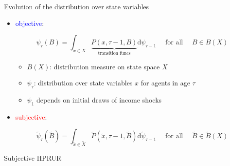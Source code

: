 \documentclass{beamer}
\begin{document}
\begin{frame}{Evolution of the distribution over state variables}
	\begin{itemize}
		\item \textcolor{blue}{objective}: 
		
		\begin{equation*}
			\label{Eq:DistDynObj}
			\psi_{\tau}(B)=\int_{x \in X} \underbrace{P(x, \tau-1, B)}_{\text{transition funcs}}  \mathrm{d}\psi_{\tau-1} \quad \text { for all } \quad B\in B(X)
		\end{equation*}
		
		\begin{itemize}
			\item $B(X)$:  distribution measure on state space $X$
			\item $\psi_{\tau}$: distribution over state variables $x$ for agents in age $\tau$
			\item $\psi_{1}$ depends on initial draws of income shocks 
		\end{itemize}
		
		\item \textcolor{red}{subjective}: 
		
		\begin{equation*}
			\label{Eq:DistDynSub}
			\tilde \psi_{\tau}(\tilde B)=\int_{\tilde x \in \tilde X} \tilde P(\tilde x, \tau-1, \tilde B) \mathrm{d} \tilde \psi_{\tau-1} \quad \text { for all } \quad \tilde B \in \tilde B(X)
		\end{equation*}
		
	\end{itemize}
\end{frame}


\begin{frame}{Subjective HPRUR}
	\label{StE_dist_compare_SHPRUR}
	
	\begin{figure}[!ht]
		\begin{center}
			 \\
			 \\
		\end{center}
	\end{figure}
\end{frame}	
\end{document}
